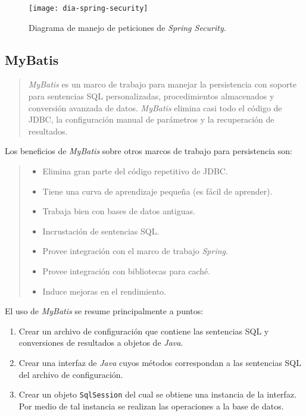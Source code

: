 \begin{figure}[h]
	\centering
	\texttt{[image: dia-spring-security]}
	\caption{Diagrama de manejo de peticiones de \textit{Spring Security}\cite{ProSpringSecurity}.}
	\label{fig:dia-spring-security}
\end{figure}

\subsection{MyBatis}\label{sec:mybatis}
\begin{quote}
\textit{MyBatis} es un marco de trabajo para manejar la persistencia con soporte para sentencias SQL personalizadas, procedimientos almacenados y conversión avanzada de datos. \textit{MyBatis} elimina casi todo el código de JDBC, la configuración manual de parámetros y la recuperación de resultados\cite{MyBatis}.
\end{quote}

Los beneficios de \textit{MyBatis} sobre otros marcos de trabajo para persistencia son\cite{PersistenceWithMyBatis}:
\begin{quote}
	\begin{itemize}
		\item Elimina gran parte del código repetitivo de JDBC.
		\item Tiene una curva de aprendizaje pequeña (es fácil de aprender).
		\item Trabaja bien con bases de datos antiguas.
		\item Incrustación de sentencias SQL.
		\item Provee integración con el marco de trabajo \textit{Spring}.
		\item Provee integración con bibliotecas para caché.
		\item Induce mejoras en el rendimiento.
	\end{itemize}
\end{quote}

El uso de \textit{MyBatis} se resume principalmente a puntos\cite{PersistenceWithMyBatis}:
\begin{enumerate}
	\item Crear un archivo de configuración que contiene las sentencias SQL y conversiones de resultados a objetos de \textit{Java}.
	\item Crear una interfaz de \textit{Java} cuyos métodos correspondan a las sentencias SQL del archivo de configuración.
	\item Crear un objeto \texttt{SqlSession} del cual se obtiene una instancia de la interfaz. Por medio de tal instancia se realizan las operaciones a la base de datos.
\end{enumerate}

